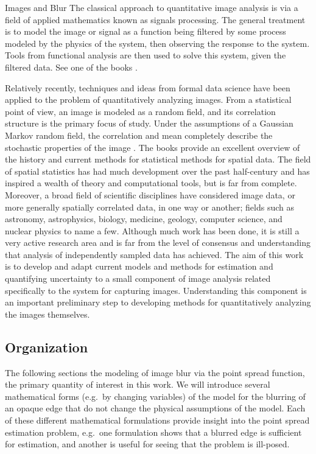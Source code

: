 \begin{chapter}{Images and Blur}
The classical approach to quantitative image analysis is via a field of applied mathematics known as signals processing.
The general treatment is to model the image or signal as a function being filtered by some process modeled by the physics of the system, then observing the response to the system.
Tools from functional analysis are then used to solve this system, given the filtered data.
See one of the books \citep{vogel2002,epstein2008}.

Relatively recently, techniques and ideas from formal data science have been applied to the problem of quantitatively analyzing images.
From a statistical point of view, an image is modeled as a random field, and its correlation structure is the primary focus of study.
Under the assumptions of a Gaussian Markov random field, the correlation and mean completely describe the stochastic properties of the image \citep{rue2005gaussian}.
The books \citep{cressie1993statistics,rue2005gaussian} provide an excellent overview of the history and current methods for statistical methods for spatial data.
The field of spatial statistics has had much development over the past half-century and has inspired a wealth of theory and computational tools, but is far from complete.
Moreover, a broad field of scientific disciplines have considered image data, or more generally spatially correlated data, in one way or another; fields such as astronomy, astrophysics, biology, medicine, geology, computer science, and nuclear physics to name a few.
Although much work has been done, it is still a very active research area and is far from the level of consensus and understanding that analysis of independently sampled data has achieved. 
The aim of this work is to develop and adapt current models and methods for estimation and quantifying uncertainty to a small component of image analysis related specifically to the system for capturing images.
Understanding this component is an important preliminary step to developing methods for quantitatively analyzing the images themselves.

\subsection{Organization}
The following sections the modeling of image blur via the point spread function, the primary quantity of interest in this work.
We will introduce several mathematical forms  (e.g.~by changing variables) of the model for the blurring of an opaque edge that do not change the physical assumptions of the model.
Each of these different mathematical formulations provide insight into the point spread estimation problem, e.g.~one formulation shows that a blurred edge is sufficient for estimation, and another is useful for seeing that the problem is ill-posed.  


\end{chapter}
